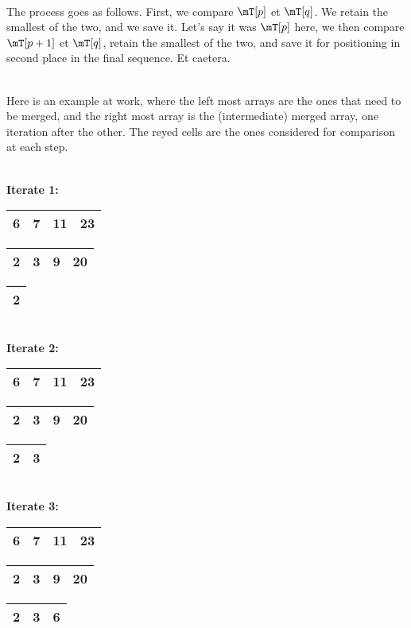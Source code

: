 \documentclass[a4paper,12pt]{article}
\begin{document}
\quad\\
The process goes as follows. First, we compare $\mT[p]$ et $\mT[q]$.
 We retain the smallest of the two, and we save it. Let's say it was $\mT[p]$ here, we then compare $\mT[p+1]$ et $\mT[q]$, retain the smallest of the two, and save it for positioning in second place in the final sequence. Et caetera.

\quad\\
Here is an example at work, where the left most arrays are the ones that need to be merged, and the right most array is the (intermediate) merged array, one iteration after the other. The reyed cells are the ones considered for comparison at each step.

\quad\\
\textbf{Iterate 1:}
\quad
\begin{tabular}{|c|c|c|c|}
  \hline \cellcolor{gray}6 & 7 & 11 & 23 \\ \hline
\end{tabular}
\quad 
\begin{tabular}{|c|c|c|c|}
  \hline \cellcolor{gray}2 & 3 & 9 & 20 \\ \hline
\end{tabular}
\quad 
\begin{tabular}{|c|}
  \hline 2 \\ \hline
\end{tabular}

\quad\\
\textbf{Iterate 2:}
\quad
\begin{tabular}{|c|c|c|c|}
  \hline \cellcolor{gray}6 & 7 & 11 & 23 \\ \hline
\end{tabular}
\quad 
\begin{tabular}{|c|c|c|c|}
  \hline  2 & \cellcolor{gray}3 & 9 & 20 \\ \hline
\end{tabular}
\quad 
\begin{tabular}{|c|c|}
  \hline 2 & 3 \\ \hline
\end{tabular}


\quad\\
\textbf{Iterate 3:}
\quad
\begin{tabular}{|c|c|c|c|}
  \hline \cellcolor{gray}6 & 7 & 11 & 23 \\ \hline
\end{tabular}
\quad 
\begin{tabular}{|c|c|c|c|}
  \hline  2 & 3 & \cellcolor{gray}9 & 20 \\ \hline
\end{tabular}
\quad 
\begin{tabular}{|c|c|c|}
  \hline 2 & 3 & 6\\ \hline
\end{tabular}
\end{document}
